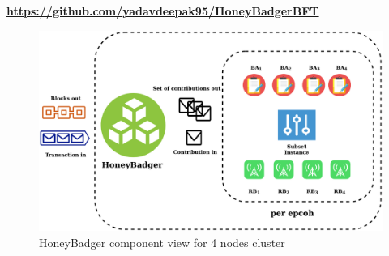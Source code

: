 \href{https://github.com/yadavdeepak95/HoneyBadgerBFT}{\textbf{https://github.com/yadavdeepak95/HoneyBadgerBFT}}
\begin{figure}[!h]
    \centering
    \includegraphics[width=1\textwidth]{images/hbbft_map.png}
    \caption{HoneyBadger component view for 4 nodes cluster}
    \label{fig:hbbft_map}
\end{figure}